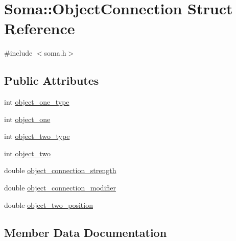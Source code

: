 \hypertarget{structSoma_1_1ObjectConnection}{}\section{Soma\+:\+:Object\+Connection Struct Reference}
\label{structSoma_1_1ObjectConnection}


{\ttfamily \#include $<$soma.\+h$>$}

\subsection*{Public Attributes}
\begin{DoxyCompactItemize}
\item 
int \mbox{\hyperlink{structSoma_1_1ObjectConnection_aa24770c082347464b35203cd65703386}{object\+\_\+one\+\_\+type}}
\item 
int \mbox{\hyperlink{structSoma_1_1ObjectConnection_ab882c137a4c8414c3663e254ccf5c27d}{object\+\_\+one}}
\item 
int \mbox{\hyperlink{structSoma_1_1ObjectConnection_a948d7e2d1db9b33d3fca95f249fb48c7}{object\+\_\+two\+\_\+type}}
\item 
int \mbox{\hyperlink{structSoma_1_1ObjectConnection_a6a16f602b8206114618db99a45c99e6f}{object\+\_\+two}}
\item 
double \mbox{\hyperlink{structSoma_1_1ObjectConnection_aa7973892dc2435b992a657a4c1e29eb3}{object\+\_\+connection\+\_\+strength}}
\item 
double \mbox{\hyperlink{structSoma_1_1ObjectConnection_a55c6abf4a7906ee1ffede53b7fa36aa6}{object\+\_\+connection\+\_\+modifier}}
\item 
double \mbox{\hyperlink{structSoma_1_1ObjectConnection_a00112b17c9f78d05c2d2e684f304ec03}{object\+\_\+two\+\_\+position}}
\end{DoxyCompactItemize}


\subsection{Member Data Documentation}
\mbox{\label{structSoma_1_1ObjectConnection_a55c6abf4a7906ee1ffede53b7fa36aa6}} 
